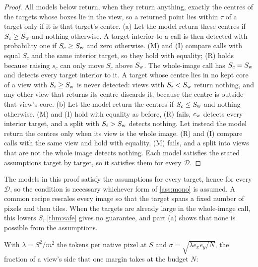 \begin{proof}
All models below return, when they return anything, exactly the centres of the targets whose boxes lie in the view, so a returned point lies within $\tau$ of a target only if it is that target's centre. (a) Let the model return these centres if $S_c \ge S_{\mathrm{w}}$ and nothing otherwise. A target interior to a call is then detected with probability one if $S_c \ge S_{\mathrm{w}}$ and zero otherwise. (M) and (I) compare calls with equal $S_c$ and the same interior target, so they hold with equality; (R) holds because raising $s_c$ can only move $S_c$ above $S_{\mathrm{w}}$. The whole-image call has $S_c = S_{\mathrm{w}}$ and detects every target interior to it. A target whose centre lies in no kept core of a view with $S_i \ge S_{\mathrm{w}}$ is never detected: views with $S_i < S_{\mathrm{w}}$ return nothing, and any other view that returns its centre discards it, because the centre is outside that view's core. (b) Let the model return the centres if $S_c \le S_{\mathrm{w}}$ and nothing otherwise. (M) and (I) hold with equality as before, (R) fails, $c_{\mathrm{w}}$ detects every interior target, and a split with $S_i > S_{\mathrm{w}}$ detects nothing. Let instead the model return the centres only when its view is the whole image. (R) and (I) compare calls with the same view and hold with equality, (M) fails, and a split into views that are not the whole image detects nothing. Each model satisfies the stated assumptions target by target, so it satisfies them for every $\mathcal{D}$.
\end{proof}

The models in this proof satisfy the assumptions for every target, hence for every $\mathcal{D}$, so the condition is necessary whichever form of \cref{ass:mono} is assumed. A common recipe rescales every image so that the target spans a fixed number of pixels and then tiles. When the targets are already large in the whole-image call, this lowers $S$, \cref{thm:safe} gives no guarantee, and part (a) shows that none is possible from the assumptions.

With $\lambda = S^2/m^2$ the tokens per native pixel at $S$ and $\sigma = \sqrt{\lambda e_xe_y/N}$, the fraction of a view's side that one margin takes at the budget $N$:

